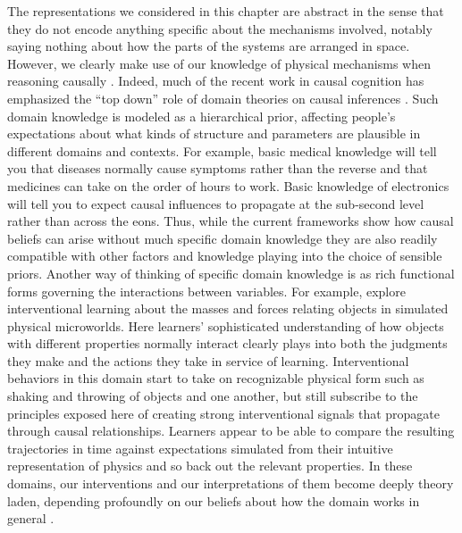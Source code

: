 \documentclass{cambridge7A}%
\begin{document}
The representations we considered in this chapter are abstract in the sense that they do not encode anything specific about the mechanisms involved, notably saying nothing about how the parts of the systems are arranged in space.  However, we clearly make use of our knowledge of physical mechanisms when reasoning causally \citep{ahn1995role,bramley2018physics}.  Indeed, much of the recent work in causal cognition has emphasized the ``top down'' role of domain theories on causal inferences \citep{griffiths2009theory,griffiths2005causes,lake2015human}.  Such domain knowledge is modeled as a hierarchical prior, affecting people's expectations about what kinds of structure and parameters are plausible in different domains and contexts.  For example, basic medical knowledge will tell you that diseases normally cause symptoms rather than the reverse and that medicines can take on the order of hours to work.  Basic knowledge of electronics will tell you to expect causal influences to propagate at the sub-second level rather than across the eons.  Thus, while the current frameworks show how causal beliefs can arise without much specific domain knowledge they are also readily compatible with other factors and knowledge playing into the choice of sensible priors.  Another way of thinking of specific domain knowledge is as rich functional forms governing the interactions between variables.  For example, \cite{bramley2018physics} explore interventional learning about the masses and forces relating objects in simulated physical microworlds.  Here learners' sophisticated understanding of how objects with different properties normally interact clearly plays into both the judgments they make and the actions they take in service of learning.  Interventional behaviors in this domain start to take on recognizable physical form such as shaking and throwing of objects and one another, but still subscribe to the principles exposed here of creating strong interventional signals that propagate through causal relationships.  Learners appear to be able to compare the resulting trajectories in time against expectations simulated from their intuitive representation of physics and so back out the relevant properties.  In these domains, our interventions and our interpretations of them become deeply theory laden, depending profoundly on our beliefs about how the domain works in general \citep{bramley2017neurath}.
\end{document}
